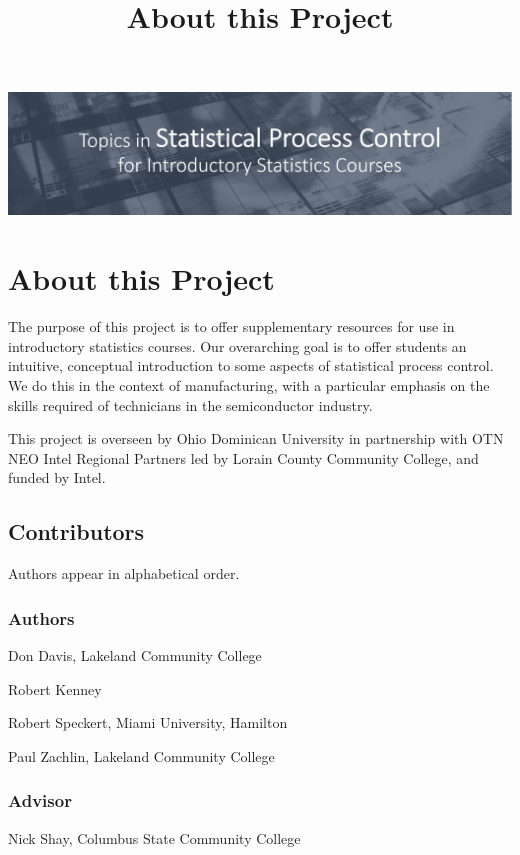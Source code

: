 \documentclass{ximera}
\title{About this Project} \license{CC BY-NC-SA 4.0}
\begin{document}
\begin{abstract}
\end{abstract}
\maketitle

\begin{image}
\includegraphics{titleSlideQC.jpg}
\end{image}

\section*{About this Project}
The purpose of this project is to offer supplementary resources for use in introductory statistics courses.  Our overarching goal is to offer students an intuitive, conceptual introduction to some 
aspects of statistical process control.  We do this in the context of manufacturing, with a particular emphasis on the skills required of technicians in the semiconductor industry.

This project is overseen by Ohio Dominican University in partnership with OTN NEO Intel Regional Partners led by Lorain County Community College, and funded by Intel.


\subsection*{Contributors}
Authors appear in alphabetical order.

\subsubsection*{Authors}

Don Davis, Lakeland Community College

Robert Kenney

Robert Speckert, Miami University, Hamilton

Paul Zachlin, Lakeland Community College

\subsubsection*{Advisor}
Nick Shay, Columbus State Community College
\end{document}
